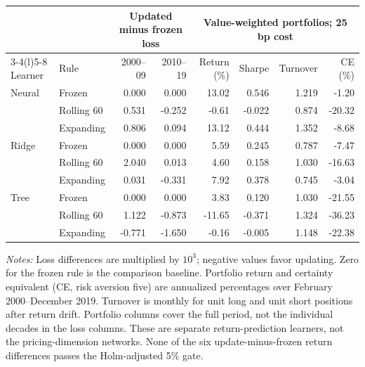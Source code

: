 \begin{widetable}[!tbp]
\centering
\begin{minipage}{\textwidth}
\caption{Forecast updating and portfolio performance by learner and update rule}
\label{tab:temporal-economic}
\footnotesize
\setlength{\tabcolsep}{4pt}
\renewcommand{\arraystretch}{1.16}
\begin{tabular*}{\linewidth}{@{\extracolsep{\fill}}llrrrrrr@{}}
\toprule
 &  & \multicolumn{2}{c}{Updated minus frozen loss} & \multicolumn{4}{c}{Value-weighted portfolios; 25 bp cost} \\
\cmidrule(lr){3-4}\cmidrule(l){5-8}
Learner & Rule & 2000--09 & 2010--19 & Return (\%) & Sharpe & Turnover & CE (\%) \\
\midrule
Neural & Frozen & 0.000 & 0.000 & 13.02 & 0.546 & 1.219 & -1.20 \\
 & Rolling 60 & 0.531 & -0.252 & -0.61 & -0.022 & 0.874 & -20.32 \\
 & Expanding & 0.806 & 0.094 & 13.12 & 0.444 & 1.352 & -8.68 \\
\addlinespace[5pt]
Ridge & Frozen & 0.000 & 0.000 & 5.59 & 0.245 & 0.787 & -7.47 \\
 & Rolling 60 & 2.040 & 0.013 & 4.60 & 0.158 & 1.030 & -16.63 \\
 & Expanding & 0.031 & -0.331 & 7.92 & 0.378 & 0.745 & -3.04 \\
\addlinespace[5pt]
Tree & Frozen & 0.000 & 0.000 & 3.83 & 0.120 & 1.030 & -21.55 \\
 & Rolling 60 & 1.122 & -0.873 & -11.65 & -0.371 & 1.324 & -36.23 \\
 & Expanding & -0.771 & -1.650 & -0.16 & -0.005 & 1.148 & -22.38 \\
\bottomrule
\end{tabular*}
\par\vspace{4pt}
{\footnotesize\raggedright\textit{Notes:} Loss differences are multiplied by $10^3$; negative values favor updating. Zero for the frozen rule is the comparison baseline. Portfolio return and certainty equivalent (CE, risk aversion five) are annualized percentages over February 2000--December 2019. Turnover is monthly for unit long and unit short positions after return drift. Portfolio columns cover the full period, not the individual decades in the loss columns. These are separate return-prediction learners, not the pricing-dimension networks. None of the six update-minus-frozen return differences passes the Holm-adjusted 5\% gate.\par}
\end{minipage}
\end{widetable}
